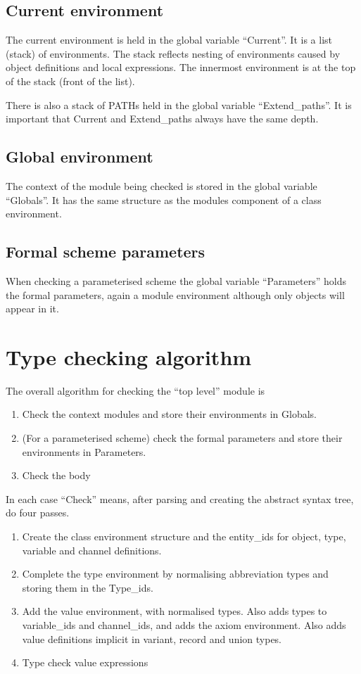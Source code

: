 \documentclass[a4paper]{article}
\begin{document}
\subsection{Current environment}
\label{sec:current_env}

The current environment is held in the global variable ``Current''.
It is a list (stack) of environments.  The stack reflects nesting of
environments caused by object definitions and local expressions.  The
innermost environment is at the top of the stack (front of the list).

There is also a stack of PATHs held in the global variable
``Extend\_paths''.  It is important that Current and Extend\_paths
always have the same depth.

\subsection{Global environment}

The context of the module being checked is stored in the global
variable ``Globals''.  It has the same structure as the modules
component of a class environment.

\subsection{Formal scheme parameters}

When checking a parameterised scheme the global variable
``Parameters'' holds the formal parameters, again a module environment
although only objects will appear in it.


\section{Type checking algorithm}
\label{sec:algorithm}

The overall algorithm for checking the ``top level'' module is
\begin{enumerate}
\item Check the context modules and store their environments in
  Globals.
\item (For a parameterised scheme) check the formal parameters and store their environments in
  Parameters.
\item Check the body
\end{enumerate}

In each case ``Check'' means, after parsing and creating the abstract
syntax tree, do four passes.
\begin{enumerate}
\item Create the class environment structure and the entity\_ids for object,
  type, variable and channel definitions.  
\item Complete the type environment by normalising abbreviation types
  and storing them in the Type\_ids.
\item Add the value environment, with normalised types.  Also adds
  types to variable\_ids and channel\_ids, and adds the axiom
  environment.  Also adds value definitions implicit in variant,
  record and union types.
\item Type check value expressions
\end{enumerate}
\end{document}
